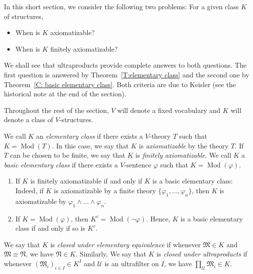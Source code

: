 \documentclass{scrartcl}
\DeclareMathOperator{\Mod}{Mod}
\renewcommand{\phi}{\varphi}
\newcommand{\SU}{\mathscr{U}}
\begin{document}
In this short section, we consider the following two problems: For a given class $K$ of structures,

\begin{itemize}
\item 
When is $K$ axiomatizable?
\item
When is $K$ finitely axiomatizable?
\end{itemize}

We shall see that ultraproducts provide complete answers to both questions. The first question is answered by Theorem~\ref{T:elementary class} and the second one by Theorem~\ref{C: basic elementary class}. Both criteria are due to Keisler (see the historical note at the end of the section).

Throughout the rest of the section, $V$ will denote a fixed vocabulary and $K$ will denote a class of $V$-structures.
\begin{definition}
We call $K$ an \emph{elementary class} if there exists a $V$-theory $T$  such that $K=\Mod(T)$.
In this case, we say that $K$ is \emph{axiomatizable} by the theory $T$. If $T$ can be chosen to be finite, we say that $K$ is \emph{finitely axiomatizable}.
We call $K$ a \emph{basic elementary class} if  there exists a $V$-sentence $\phi$  such that $K=\Mod(\phi)$.

\end{definition}

\begin{remarks}\hfill
\label{R:finite axiomatizability}
\begin{enumerate}
\item
If $K$ is finitely axiomatizable if and only if $K$ is a basic elementary class: Indeed, if $K$ is axiomatizable by a finite theory $\{\phi_1,\dots, \phi_n\}$, then $K$ is axiomatizable by $\phi_1\land\dots\land\phi_n$.
\item
If $K=\Mod(\phi)$, then $K^c=\Mod(\neg\phi)$. Hence, $K$ is a basic elementary class if and only if so is $K^c$. 
\end{enumerate}
\end{remarks}



We say that $K$ is \emph{closed under elementary equivalence} if whenever $\mathfrak{M}\in K$ and $\mathfrak{M}\equiv\mathfrak{N}$, we have $\mathfrak{N}\in K$. Similarly, We say that $K$ is \emph{closed under ultraproducts} if whenever $(\mathfrak{M}_i)_{i\in I}\in K^I$ and $\SU$ is an ultrafilter on $I$, we have $\prod_\mathscr{U}\mathfrak{M}_i\in K$.
\end{document}
